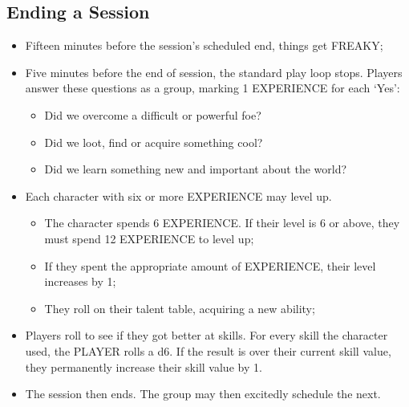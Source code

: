 \subsection{Ending a Session}
\begin{itemize}
    \item {Fifteen minutes before the session's scheduled end, things get FREAKY;}
    \item {Five minutes before the end of session, the standard play loop stops. Players answer these questions as a group, marking 1 EXPERIENCE for each `Yes':}
    \begin{itemize}
        \item {Did we overcome a difficult or powerful foe?}
        \item {Did we loot, find or acquire something cool?}
        \item {Did we learn something new and important about the world?}
    \end{itemize}
    \item {Each character with six or more EXPERIENCE may level up.}
    \begin{itemize}
        \item {The character spends 6 EXPERIENCE. If their level is 6 or above, they must spend 12 EXPERIENCE to level up;}
        \item {If they spent the appropriate amount of EXPERIENCE, their level increases by 1;}
        \item {They roll on their talent table, acquiring a new ability;}
    \end{itemize}
    \item {Players roll to see if they got better at skills. For every skill the character used, the PLAYER rolls a d6. If the result is over their current skill value, they permanently increase their skill value by 1.}
    \item {The session then ends. The group may then excitedly schedule the next.}
\end{itemize}
